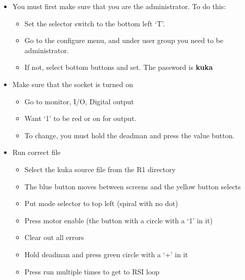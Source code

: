 \documentclass[12pt,letterpaper]{article}
\begin{document}
\begin{itemize}
\item You must first make sure that you are the administrator.
To do this:

\begin{itemize}
\item Set the selector switch to the bottom left ‘T’.

\item Go to the configure menu, and under user group you need to be administrator.

\item If not, select bottom buttons and set. The password is \textbf{kuka}
\end{itemize}

\item Make sure that the socket is turned on

\begin{itemize}
\item Go to monitor, I/O, Digital output

\item Want ‘1’ to be red or on for output.

\item To change, you must hold the deadman and press the value button.
\end{itemize}

\item Run correct file

\begin{itemize}
\item Select the kuka source file from the R1 directory

\item The blue button moves between screens and the yellow button selects

\item Put mode selector to top left (spiral with no dot)

\item Press motor enable (the button with a circle with a ‘1’ in it)

\item Clear out all errors

\item Hold deadman and press green circle with a ‘+’ in it

\item Press run multiple times to get to RSI loop
\end{itemize}
\end{itemize}
\end{document}
